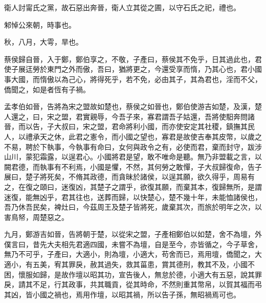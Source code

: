 \begin{pinyinscope}
衛人討甯氏之黨，故石惡出奔晉，衛人立其從之圃，以守石氏之祀，禮也。

邾悼公來朝，時事也。

秋，八月，大雩，旱也。

蔡侯歸自晉，入于鄭，鄭伯享之，不敬，子產曰，蔡侯其不免乎，日其過此也，君使子展迋勞於東門之外而傲，吾曰，猶將更之，今還受享而惰，乃其心也，君小國事大國，而惰傲以為己心，將得死乎，若不免，必由其子，其為君也，淫而不父，僑聞之，如是者恆有子禍。

孟孝伯如晉，告將為宋之盟故如楚也，蔡侯之如晉也，鄭伯使游吉如楚，及漢，楚人還之，曰，宋之盟，君實親辱，今吾子來，寡君謂吾子姑還，吾將使馹奔問諸晉，而以告，子大叔曰，宋之盟，君命將利小國，而亦使安定其社稷，鎮撫其民人，以禮承天之休，此君之憲令，而小國之望也，寡君是故使吉奉其皮幣，以歲之不易，聘於下執事，今執事有命曰，女何與政令之有，必使而君，棄而封守，跋涉山川，蒙犯霜露，以逞君心。小國將君是望，敢不唯命是聽。無乃非盟載之言，以闕君德，而執事有不利焉，小國是懼，不然，其何勞之敢憚，子大叔歸復命，告子展曰，楚子將死矣，不脩其政德，而貪昧於諸侯，以逞其願，欲久得乎，周易有之，在復之頤曰，迷復凶，其楚子之謂乎，欲復其願，而棄其本，復歸無所，是謂迷復，能無凶乎，君其往也，送葬而歸，以快楚心，楚不幾十年，未能恤諸侯也，吾乃休吾民矣，裨灶曰，今茲周王及楚子皆將死，歲棄其次，而旅於明年之次，以害鳥帑，周楚惡之。

九月，鄭游吉如晉，告將朝于楚，以從宋之盟，子產相鄭伯以如楚，舍不為壇，外僕言曰，昔先大夫相先君適四國，未嘗不為壇，自是至今，亦皆循之，今子草舍，無乃不可乎，子產曰，大適小，則為壇，小適大，苟舍而已，焉用壇，僑聞之，大適小，有五美，宥其罪戾，赦其過失，救其菑患，賞其德刑，教其不及，小國不困，懷服如歸，是故作壇以昭其功，宣告後人，無怠於德，小適大有五惡，說其罪戾，請其不足，行其政事，共其職貢，從其時命，不然則重其幣帛，以賀其福而弔其凶，皆小國之禍也，焉用作壇，以昭其禍，所以告子孫，無昭禍焉可也。


\end{pinyinscope}
